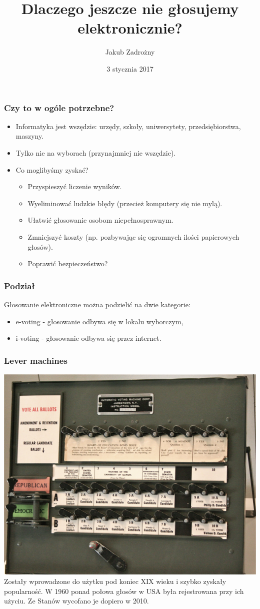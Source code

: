 \documentclass{beamer}
\title[Głosowanie elektroniczne]{Dlaczego jeszcze nie głosujemy elektronicznie?}
\author{Jakub Zadrożny}
\institute[II UWr]{
	Instytut Informatyki UWr.
}
\date{3 stycznia 2017}
\begin{document}
 
\frame{\titlepage}
 
\begin{frame}
\frametitle{Czy to w ogóle potrzebne?}
\pause
\begin{itemize}
\item
Informatyka jest wszędzie: urzędy, szkoły, uniwersytety, przedsiębiorstwa, maszyny. \pause
\item
Tylko nie na wyborach (przynajmniej nie wszędzie). \pause
\item 
Co moglibyśmy zyskać? \pause
\begin{itemize}
\item Przyspieszyć liczenie wyników. \pause
\item Wyeliminować ludzkie błędy (przecież komputery się nie mylą). \pause
\item Ułatwić głosowanie osobom niepełnosprawnym. \pause
\item Zmniejszyć koszty (np. pozbywając się ogromnych ilości papierowych głosów). \pause
\item Poprawić bezpieczeństwo?
\end{itemize}
\end{itemize}
\end{frame}

\begin{frame}
\frametitle{Podział}
Głosowanie elektroniczne można podzielić na dwie kategorie: \pause
\begin{itemize}
\item e-voting - głosowanie odbywa się w lokalu wyborczym, \pause
\item i-voting - głosowanie odbywa się przez internet.
\end{itemize}
\end{frame}

\begin{frame}
\frametitle{Lever machines}
\includegraphics[height=0.65\paperheight, center]{lever} \\ \pause
Zostały wprowadzone do użytku pod koniec XIX wieku i szybko zyskały popularność. \pause W 1960 ponad połowa głosów w USA była rejestrowana przy ich użyciu. \pause Ze Stanów wycofano je dopiero w 2010.
\end{frame}
\end{document}
